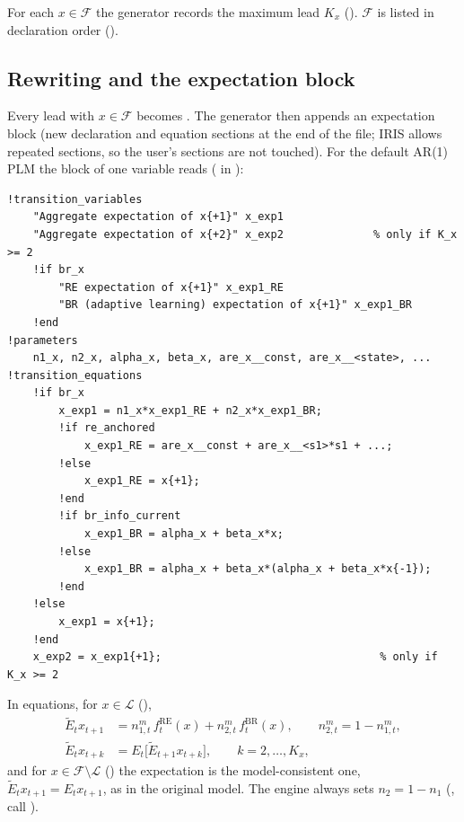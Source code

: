 \documentclass[11pt,a4paper]{article}
\newcommand{\RE}{\mathrm{RE}}
\newcommand{\BR}{\mathrm{BR}}
\newcommand{\fRE}{f^{\RE}}
\newcommand{\fBR}{f^{\BR}}
\newcommand{\Eagg}{\tilde{E}}
\begin{document}
For each $x\in\mathcal{F}$ the generator records the maximum lead $K_x$ ().
$\mathcal{F}$ is listed in declaration order ().

\subsection{Rewriting and the expectation block}\label{sec:block}

Every lead  with $x\in\mathcal{F}$ becomes . The generator then appends
an expectation block (new declaration and equation sections at the end of the file; IRIS allows
repeated sections, so the user's sections are not touched). For the default AR(1) PLM the block
of one variable reads ( in ):

\begin{lstlisting}
!transition_variables
    "Aggregate expectation of x{+1}" x_exp1
    "Aggregate expectation of x{+2}" x_exp2              % only if K_x >= 2
    !if br_x
        "RE expectation of x{+1}" x_exp1_RE
        "BR (adaptive learning) expectation of x{+1}" x_exp1_BR
    !end
!parameters
    n1_x, n2_x, alpha_x, beta_x, are_x__const, are_x__<state>, ...
!transition_equations
    !if br_x
        x_exp1 = n1_x*x_exp1_RE + n2_x*x_exp1_BR;
        !if re_anchored
            x_exp1_RE = are_x__const + are_x__<s1>*s1 + ...;
        !else
            x_exp1_RE = x{+1};
        !end
        !if br_info_current
            x_exp1_BR = alpha_x + beta_x*x;
        !else
            x_exp1_BR = alpha_x + beta_x*(alpha_x + beta_x*x{-1});
        !end
    !else
        x_exp1 = x{+1};
    !end
    x_exp2 = x_exp1{+1};                                  % only if K_x >= 2
\end{lstlisting}

In equations, for $x\in\mathcal{L}$ (),
\begin{align}
  \Eagg_t x_{t+1} &= n^m_{1,t}\,\fRE_t(x) + n^m_{2,t}\,\fBR_t(x),
      \qquad n^m_{2,t} = 1 - n^m_{1,t}, \label{eq:agg}\\
  \Eagg_t x_{t+k} &= E_t\bigl[\Eagg_{t+1} x_{t+k}\bigr], \qquad k = 2,\dots,K_x, \label{eq:aggk}
\end{align}
and for $x\in\mathcal{F}\setminus\mathcal{L}$ () the expectation is the
model-consistent one, $\Eagg_t x_{t+1} = E_t x_{t+1}$, as in the original model. The engine always
sets $n_{2}=1-n_{1}$ (, call ).
\end{document}
